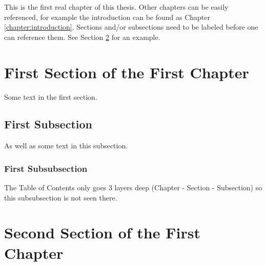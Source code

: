 This is the first real chapter of this thesis. Other chapters can be easily referenced, for example the introduction can be found as Chapter \ref{chapter:introduction}. Sections and/or subsections need to be labeled before one can reference them. See Section \ref{sec:second-section} for an example.

\section{First Section of the First Chapter}
Some text in the first section.
\subsection{First Subsection}
As well as some text in this subsection.
\subsubsection{First Subsubsection}
The Table of Contents only goes 3 layers deep (Chapter - Section - Subsection) so this subsubsection is not seen there.

\section{Second Section of the First Chapter}\label{sec:second-section}